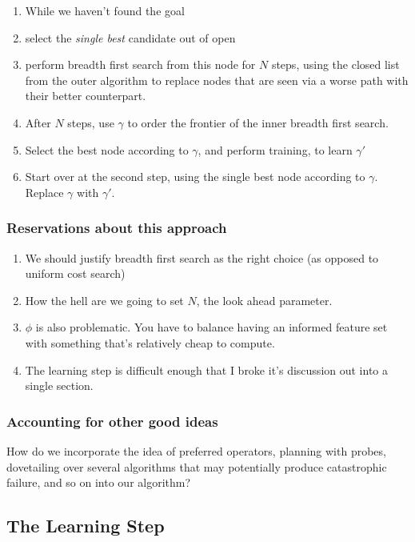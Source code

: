 \documentclass{report}
\begin{document}
  \begin{enumerate}
  \item While we haven't found the goal
  \item select the {\em single best} candidate out of open
  \item perform breadth first search from this node for $N$ steps,
    using the closed list from the outer algorithm to replace nodes
    that are seen via a worse path with their better counterpart.
  \item After $N$ steps, use $\gamma$ to order the frontier of the
    inner breadth first search.
  \item Select the best node according to $\gamma$, and perform
    training, to learn $\gamma'$
  \item Start over at the second step, using the single best node
    according to $\gamma$. Replace $\gamma$ with $\gamma'$.
  \end{enumerate}

\subsubsection{Reservations about this approach}

\begin{enumerate}
  \item We should justify breadth first search as the right choice
    (as opposed to uniform cost search)
  \item How the hell are we going to set $N$, the look ahead
    parameter.
  \item $\phi$ is also problematic.  You have to balance having an
    informed feature set with something that's relatively cheap to
    compute.
  \item The learning step is difficult enough that I broke it's
    discussion out into a single section.
\end{enumerate}

\subsubsection{Accounting for other good ideas}
  How do we incorporate the idea of preferred operators, planning with
  probes, dovetailing over several algorithms that may potentially
  produce catastrophic failure, and so on into our algorithm?


\subsection{The Learning Step}
\end{document}
